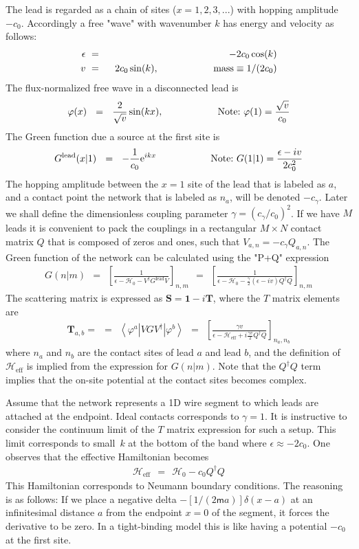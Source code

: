\documentclass[onecolumn,fleqn]{revtex4}
\newcommand{\eexp}{\mathrm{e}^}
\newcommand{\mass}{\mathsf{m}}
\newcommand{\beq}{\begin{eqnarray}}
\newcommand{\eeq}{\end{eqnarray}}
\begin{document}
The lead is regarded as a chain of sites ($x=1,2,3,...$)
with hopping amplitude $-c_0$. Accordingly a free "wave" 
with wavenumber $k$ has energy and velocity as follows:
\beq
\epsilon \ &=& \ -2c_0\cos(k) \\
v\ &=& \ \ 2c_0\sin(k), 
\hspace*{2cm} \text{mass} \equiv 1/(2c_0) 
\eeq
The flux-normalized free wave in a disconnected lead is 
\beq
\varphi(x) \ \ = \ \ \frac{2}{\sqrt{v}} \sin(kx),
\hspace*{2cm}
\mbox{Note:} \  \varphi(1)=\frac{\sqrt{v}}{c_0}
\eeq
The Green function due a source at the first site is 
\beq
G^{\text{lead}}(x|1) \ \ = \ \ -\frac{1}{c_0}\eexp{ikx} 
\hspace*{2cm}
\mbox{Note:} \ G(1|1)= \frac{\epsilon-iv}{2c_0^2}
\eeq
The hopping amplitude between the ${x=1}$ site of the lead 
that is labeled as $a$, and a contact point the network 
that is labeled as $n_a$, will be denoted $-c_{\gamma}$. 
Later we shall define the dimensionless coupling parameter ${\gamma=(c_{\gamma}/c_0)^2}$. 
If we have $M$ leads it is convenient to pack the couplings 
in a rectangular ${M\times N}$ contact matrix $Q$ that is composed 
of zeros and ones,  such that $V_{a,n}=-c_{\gamma} Q_{a,n}$.  
The Green function of the network can be calculated using the "P+Q" expression 
\beq
G(n|m) 
\ \ = \ \ \left[ \frac{1}{\epsilon-\mathcal{H}_0-V^{\dag}G^{\text{lead}}V} \right]_{n,m}
\ \ = \ \ \left[ \frac{1}{\epsilon-\mathcal{H}_0-\frac{\gamma}{2}(\epsilon-iv) Q^{\dag}Q} \right]_{n,m}
\eeq
The scattering matrix is expressed as $\bm{S}=\bm{1}-i\bm{T}$, 
where the $T$ matrix elements are 
\beq
\bm{T}_{a,b} =  
\ \ = \ \ \left\langle \varphi^{a} \left| VGV^{\dag} \right| \varphi^{b} \right\rangle 
\ \ = \ \ \left[\frac{\gamma v}{\epsilon-\mathcal{H}_{\text{eff}}+i\frac{\gamma v}{2} Q^{\dag}Q} \right]_{n_a,n_b}
\eeq
where $n_a$ and $n_b$ are the contact sites of lead $a$ and lead $b$, 
and the definition of $\mathcal{H}_{\text{eff}}$ is implied from the 
expression for $G(n|m)$. Note that the $Q^{\dag}Q$ term implies 
that the on-site potential at the contact sites becomes complex.  

Assume that the network represents a 1D wire segment to which leads 
are attached at the endpoint. Ideal contacts corresponds to $\gamma=1$. 
It is instructive to consider the continuum limit of the $T$ matrix 
expression for such a setup. This limit corresponds to small~$k$ 
at the bottom of the band where ${\epsilon\approx-2c_0}$. 
One observes that the effective Hamiltonian becomes 
\beq
\mathcal{H}_{\text{eff}} \ \ = \ \ \mathcal{H}_0 -c_0 Q^{\dag}Q
\eeq
This Hamiltonian corresponds to Neumann boundary conditions. 
The reasoning is as follows: If we place a negative 
delta $-[1/(2\mass a)]\delta(x-a)$ at an infinitesimal distance $a$ 
from the endpoint $x=0$ of the segment, 
it forces the derivative to be zero. In a tight-binding model 
this is like having a potential $-c_0$ at the first site.   
\end{document}
